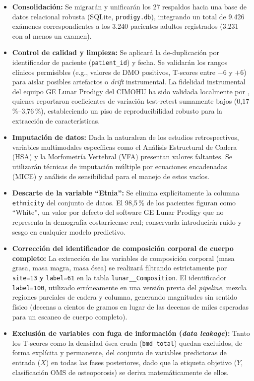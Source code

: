 \documentclass[../tesis.tex]{subfiles}
\begin{document}
\begin{itemize}
    \item \textbf{Consolidación:} Se migrarán y unificarán los 27 respaldos hacia una base de datos relacional robusta (SQLite, \texttt{prodigy.db}), integrando un total de 9.426 exámenes correspondientes a los 3.240 pacientes adultos registrados (3.231 con al menos un examen).
    \item \textbf{Control de calidad y limpieza:} Se aplicará la de-duplicación por identificador de paciente (\texttt{patient\_id}) y fecha. Se validarán los rangos clínicos permisibles (e.g., valores de DMO positivos, T-scores entre $-6$ y $+6$) para aislar posibles artefactos o \textit{drift} instrumental. La fidelidad instrumental del equipo GE Lunar Prodigy del CIMOHU ha sido validada localmente por \textcite{ChaconAraya2024}, quienes reportaron coeficientes de variación test-retest sumamente bajos (0,17\,\%--3,76\,\%), estableciendo un piso de reproducibilidad robusto para la extracción de características.
    \item \textbf{Imputación de datos:} Dada la naturaleza de los estudios retrospectivos, variables multimodales específicas como el Análisis Estructural de Cadera (HSA) y la Morfometría Vertebral (VFA) presentan valores faltantes. Se utilizarán técnicas de imputación múltiple por ecuaciones encadenadas (MICE) y análisis de sensibilidad para el manejo de estos vacíos.
    \item \textbf{Descarte de la variable ``Etnia'':} Se elimina explícitamente la columna \texttt{ethnicity} del conjunto de datos. El 98{,}5\,\% de los pacientes figuran como ``White'', un valor por defecto del software GE Lunar Prodigy que no representa la demografía costarricense real; conservarla introduciría ruido y sesgo en cualquier modelo predictivo.
    \item \textbf{Corrección del identificador de composición corporal de cuerpo completo:} La extracción de las variables de composición corporal (masa grasa, masa magra, masa ósea) se realizará filtrando estrictamente por \texttt{site=13} \textbf{y} \texttt{label=61} en la tabla \texttt{lunar\_\_Composition}. El identificador \texttt{label=100}, utilizado erróneamente en una versión previa del \textit{pipeline}, mezcla regiones parciales de cadera y columna, generando magnitudes sin sentido físico (decenas a cientos de gramos en lugar de las decenas de miles esperadas para un escaneo de cuerpo completo).
    \item \textbf{Exclusión de variables con fuga de información (\textit{data leakage}):} Tanto los T-scores como la densidad ósea cruda (\texttt{bmd\_total}) quedan excluidos, de forma explícita y permanente, del conjunto de variables predictoras de entrada ($X$) en todas las fases posteriores, dado que la etiqueta objetivo ($Y$, clasificación OMS de osteoporosis) se deriva matemáticamente de ellos.
\end{itemize}
\end{document}
